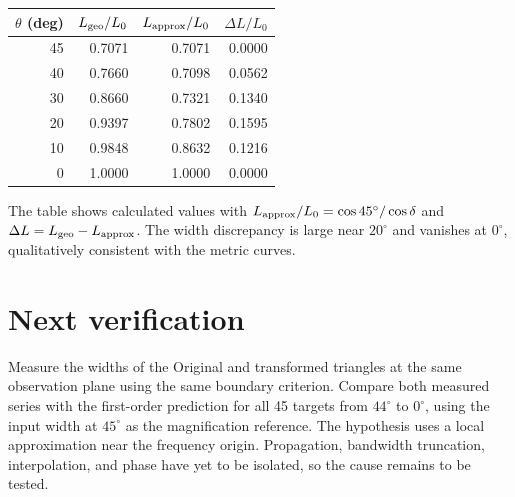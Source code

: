 \documentclass[a4paper,10pt]{article}
\begin{document}
\begin{center}
\begin{tabular}{rrrr}\toprule
$\theta$ (deg) & $L_{\rm geo}/L_0$ & $L_{\rm approx}/L_0$ & $\Delta L/L_0$\\\midrule
45 & 0.7071 & 0.7071 & 0.0000\\
40 & 0.7660 & 0.7098 & 0.0562\\
30 & 0.8660 & 0.7321 & 0.1340\\
20 & 0.9397 & 0.7802 & 0.1595\\
10 & 0.9848 & 0.8632 & 0.1216\\
0  & 1.0000 & 1.0000 & 0.0000\\\bottomrule
\end{tabular}
\end{center}
The table shows calculated values with $L_{\rm approx}/L_0=\cos45^\circ/\cos\delta$ and $\Delta L=L_{\rm geo}-L_{\rm approx}$. The width discrepancy is large near $20^\circ$ and vanishes at $0^\circ$, qualitatively consistent with the metric curves.

\section{Next verification}
Measure the widths of the Original and transformed triangles at the same observation plane using the same boundary criterion. Compare both measured series with the first-order prediction for all 45 targets from $44^\circ$ to $0^\circ$, using the input width at $45^\circ$ as the magnification reference. The hypothesis uses a local approximation near the frequency origin. Propagation, bandwidth truncation, interpolation, and phase have yet to be isolated, so the cause remains to be tested.
\end{document}
